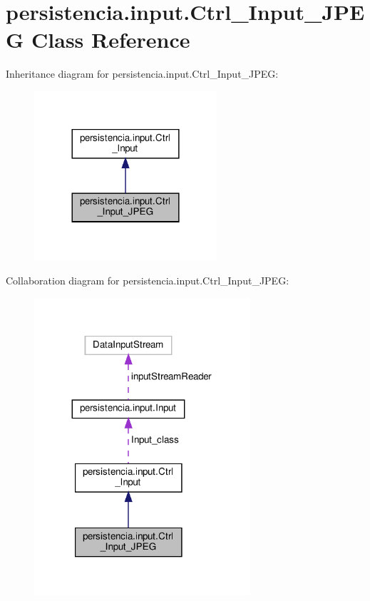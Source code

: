 \hypertarget{classpersistencia_1_1input_1_1Ctrl__Input__JPEG}{}\section{persistencia.\+input.\+Ctrl\+\_\+\+Input\+\_\+\+J\+P\+EG Class Reference}
\label{classpersistencia_1_1input_1_1Ctrl__Input__JPEG}


Inheritance diagram for persistencia.\+input.\+Ctrl\+\_\+\+Input\+\_\+\+J\+P\+EG\+:\nopagebreak
\begin{figure}[H]
\begin{center}
\leavevmode
\includegraphics[width=192pt]{classpersistencia_1_1input_1_1Ctrl__Input__JPEG__inherit__graph}
\end{center}
\end{figure}


Collaboration diagram for persistencia.\+input.\+Ctrl\+\_\+\+Input\+\_\+\+J\+P\+EG\+:
\nopagebreak
\begin{figure}[H]
\begin{center}
\leavevmode
\includegraphics[width=227pt]{classpersistencia_1_1input_1_1Ctrl__Input__JPEG__coll__graph}
\end{center}
\end{figure}
